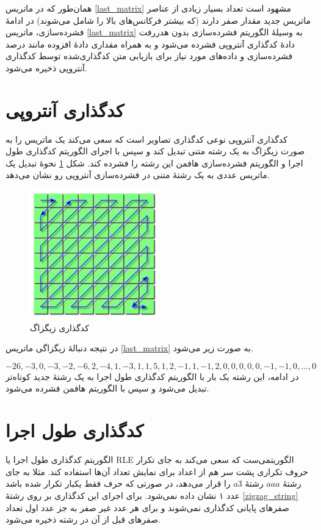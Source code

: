 همان‌طور که در ماتریس 
\ref{last_matrix}
مشهود است تعداد بسیار زیادی از عناصر ماتریس جدید
مقدار صفر دارند (که بیشتر فرکانس‌های بالا را شامل می‌شوند)
در ادامهٔ فشرده‌سازی، ماتریس 
\ref{last_matrix}
به وسیلهٔ الگوریتم فشرده‌‌سازی بدون هدررفت دادهٔ
کدگذاری آنتروپی 
فشرده می‌شود و به همراه مقداری 
دادهٔ افزوده
مانند درصد فشرده‌سازی و داده‌های مورد نیاز برای بازیابی متن کدگذاری‌شده توسط کدگذاری آنتروپی ذخیره می‌شود. 
\section{کدگذاری آنتروپی}
کدگذاری آنتروپی نوعی کدگذاری تصاویر است که سعی می‌کند یک ماتریس را به صورت زیگزاگ به یک رشته متنی تبدیل کند و سپس با اجرای
الگوریتم کدگذاری طول اجرا و الگوریتم فشرده‌سازی هافمن این رشته را فشرده کند. شکل 
\ref{zigzag}
نحوهٔ تبدیل یک ماتریس عددی به یک رشتهٔ متنی در فشرده‌سازی آنتروپی رو نشان می‌دهد.

\begin{figure}[H]
        \centering
        \includegraphics[width=0.5\textwidth]{figs/zigzag.png}
        \caption[کدگذاری زیگزاگ]{کدگذاری زیگزاگ \cite{zigzag}}
        \label{zigzag}
\end{figure}
در نتیجه دنبالهٔ زیگزاگی ماتریس \ref{last_matrix} به صورت زیر می‌شود. 

\begin{equation}
        -26, -3, 0, -3, -2, -6, 2, -4, 1, -3, 1, 1, 5, 1, 2, -1, 1, -1, 2, 0, 0, 0, 0, 0, -1, -1, 0 , \dots, 0
        \label{zigzag_string}
\end{equation}
در ادامه، این رشته یک بار با الگوریتم کدگذاری طول اجرا 
به یک رشتهٔ جدید کوتاه‌تر تبدیل می‌شود و سپس با الگوریتم هافمن فشرده می‌شود. 

\section{کدگذاری طول اجرا}
الگوریتم کدگذاری طول اجرا یا RLE الگوریتمی‌ست که سعی می‌کند
به جای تکرار حروف تکراری پشت سر هم از اعداد برای نمایش تعداد آن‌ها استفاده کند. مثلا به جای رشتهٔ 
$aaa$
رشتهٔ 
$a3$ 
را قرار می‌دهد، در صورتی که حرف فقط یکبار تکرار شده باشد عدد ۱ نشان داده نمی‌شود. برای اجرای این کدگذاری بر روی 
رشتهٔ \ref{zigzag_string} صفرهای پایانی کدگذاری نمی‌شوند و برای هر عدد غیر صفر به جز عدد اول تعداد صفرهای قبل از آن
در رشته ذخیره می‌شود.
